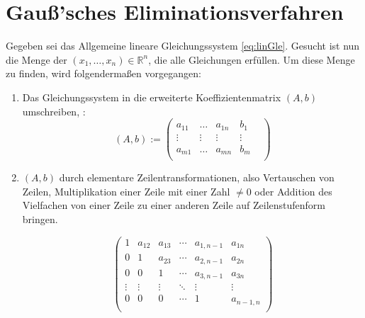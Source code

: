 \documentclass[a4paper, 12pt]{report}
\newcommand{\GE}{Gauß'sches Eliminationsverfahren }
\begin{document}
{\let\clearpage\relax \chapter{\GE}} \label{2.2}
Gegeben sei das Allgemeine lineare Gleichungssystem \ref{eq:linGle}.
Gesucht ist nun die Menge der $ (x_1, \hdots ,x_n ) \in \mathbb{R}^n $, die alle Gleichungen erfüllen.
Um diese Menge zu finden, wird folgendermaßen vorgegangen:
\begin{enumerate}
    \item Das Gleichungssystem in die erweiterte Koeffizientenmatrix $ (A, b) $ umschreiben, \cite{2}:
        \begin{equation}
            (A, b):=
            \begin{pmatrix}
                a_{11} & \hdots &  a_{1n} &  b_1  \\
                \vdots & \vdots &  \vdots & \vdots &  \\
                a_{m1} &  \hdots &  a_{mn} &  b_m \\
            \end{pmatrix}
        \end{equation}
    \item $(A, b)$ durch elementare Zeilentransformationen, also Vertauschen von Zeilen,
        Multiplikation einer Zeile mit einer Zahl $\neq 0 $ oder Addition des Vielfachen von einer Zeile zu einer
        anderen Zeile auf Zeilenstufenform bringen.
        \begin{center}
            \begin{equation}
                \label{Zeilenstufenform}
                \left(\begin{array}{cccccc}
                        1 & a_{12} & a_{13} & \cdots & a_{1,n-1} & a_{1n} \\
                        0 & 1 & a_{23} & \cdots & a_{2,n-1} & a_{2n} \\
                        0 & 0 & 1 & \cdots & a_{3,n-1} & a_{3n} \\
                        \vdots & \vdots & \vdots & \ddots & \vdots & \vdots \\
                        0 & 0 & 0 & \cdots & 1 & a_{n-1,n} \\
                \end{array}\right)
            \end{equation}
        \end{center}


\end{enumerate}
\end{document}

